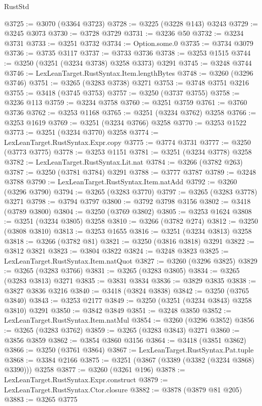 \begin{lexlean}{RustStd}
\begin{coremodule}
@3725 := @3070 (@3364 @3723)
@3728 := @3225 (@3228 @143) @3243
@3729 := @3245 @3073
@3730 := @3728 @3729
@3731 := @3236 @50
@3732 := @3234 @3731
@3733 := @3251 @3732
@3734 := Option.some.{0}
@3735 := @3734 @3079
@3736 := @3735 @3117
@3737 := @3733 @3736
@3738 := @3253 @1515
@3744 := @3250 (@3251 (@3234 @3738) @3258 @3373) @3291
@3745 := @3248 @3744
@3746 := LexLeanTarget.RustSyntax.Item.lengthBytes
@3748 := @3260 (@3296 @3746)
@3751 := @3265 (@3283 @3738) @3271
@3753 := @3748 @3751 @3216
@3755 := @3418 (@3745 @3753)
@3757 := @3250 (@3737 @3755)
@3758 := @3236 @113
@3759 := @3234 @3758
@3760 := @3251 @3759
@3761 := @3760 @3736
@3762 := @3253 @1168
@3765 := @3251 (@3234 @3762) @3258
@3766 := @3253 @1619
@3769 := @3251 (@3234 @3766) @3258
@3770 := @3253 @1522
@3773 := @3251 (@3234 @3770) @3258
@3774 := LexLeanTarget.RustSyntax.Expr.copy
@3775 := @3774 @3731
@3777 := @3250 (@3773 @3775)
@3778 := @3253 @1151
@3781 := @3251 (@3234 @3778) @3258
@3782 := LexLeanTarget.RustSyntax.Lit.nat
@3784 := @3266 (@3782 @263)
@3787 := @3250 (@3781 @3784) @3291
@3788 := @3777 @3787
@3789 := @3248 @3788
@3790 := LexLeanTarget.RustSyntax.Item.natAdd
@3792 := @3260 (@3296 @3790)
@3794 := @3265 (@3283 @3770)
@3797 := @3265 (@3283 @3778) @3271
@3798 := @3794 @3797
@3800 := @3792 @3798 @3156
@3802 := @3418 (@3789 @3800)
@3804 := @3250 (@3769 @3802)
@3805 := @3253 @1624
@3808 := @3251 (@3234 @3805) @3258
@3810 := @3266 (@3782 @274)
@3812 := @3250 (@3808 @3810)
@3813 := @3253 @1655
@3816 := @3251 (@3234 @3813) @3258
@3818 := @3266 (@3782 @81)
@3821 := @3250 (@3816 @3818) @3291
@3822 := @3812 @3821
@3823 := @3804 @3822
@3824 := @3248 @3823
@3825 := LexLeanTarget.RustSyntax.Item.natQuot
@3827 := @3260 (@3296 @3825)
@3829 := @3265 (@3283 @3766)
@3831 := @3265 (@3283 @3805)
@3834 := @3265 (@3283 @3813) @3271
@3835 := @3831 @3834
@3836 := @3829 @3835
@3838 := @3827 @3836 @3216
@3840 := @3418 (@3824 @3838)
@3842 := @3250 (@3765 @3840)
@3843 := @3253 @2177
@3849 := @3250 (@3251 (@3234 @3843) @3258 @3810) @3291
@3850 := @3842 @3849
@3851 := @3248 @3850
@3852 := LexLeanTarget.RustSyntax.Item.natMul
@3854 := @3260 (@3296 @3852)
@3856 := @3265 (@3283 @3762)
@3859 := @3265 (@3283 @3843) @3271
@3860 := @3856 @3859
@3862 := @3854 @3860 @3156
@3864 := @3418 (@3851 @3862)
@3866 := @3250 (@3761 @3864)
@3867 := LexLeanTarget.RustSyntax.Pat.tuple
@3868 := @3384 @2166
@3875 := @3251 (@3867 (@3389 (@3382 (@3234 @3868) @3390))) @3258
@3877 := @3260 (@3261 @196)
@3878 := LexLeanTarget.RustSyntax.Expr.construct
@3879 := LexLeanTarget.RustSyntax.Ctor.closure
@3882 := @3878 (@3879 @81 @205)
@3883 := @3265 @3775

\end{coremodule}
\end{lexlean}
